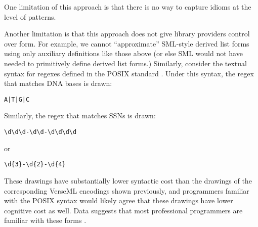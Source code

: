 One limitation of this approach is that there is no way to capture idioms at the level of patterns.

Another limitation is that this approach does not give library providers control over form. For example, we cannot ``approximate'' SML-style derived list forms using only auxiliary definitions like those above (or else SML would not have needed to primitively define derived list forms.) 
Similarly, consider the textual syntax for regexes defined in the POSIX standard \cite{STD95954}. Under this syntax, the regex that matches DNA bases is drawn:
\begin{lstlisting}[numbers=none]
A|T|G|C
\end{lstlisting}
Similarly, the regex that matches SSNs is drawn:
\begin{lstlisting}[numbers=none]
\d\d\d-\d\d-\d\d\d\d
\end{lstlisting}
or
\begin{lstlisting}[numbers=none]
\d{3}-\d{2}-\d{4}
\end{lstlisting}
These drawings have substantially lower syntactic cost than the drawings of the corresponding VerseML encodings shown previously, and programmers familiar with the POSIX syntax would likely agree that these drawings have lower cognitive cost as well. Data suggests that most professional programmers are familiar with these forms \cite{Omar:2012:ACC:2337223.2337324}.

\vspace{-6px}
